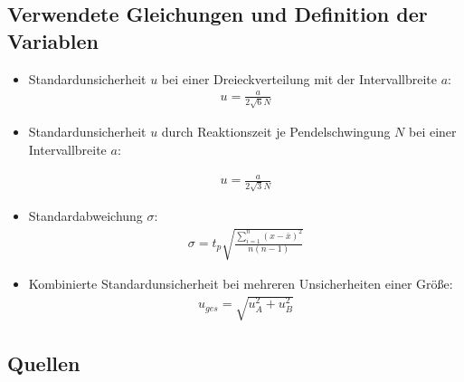 
\subsection{Verwendete Gleichungen und Definition der Variablen}\label{VGuD}
\begin{itemize}
\item Standardunsicherheit $u$ bei einer Dreieckverteilung mit der Intervallbreite $a$:
\begin{align}
	u=\frac{a}{2\sqrt{6}N} \label{su3}
\end{align} 

\item Standardunsicherheit $u$ durch Reaktionszeit je Pendelschwingung $N$ bei einer Intervallbreite $a$:

\begin{align}
	u=\frac{a}{2\sqrt{3}N} \label{sur}
\end{align} 


\item Standardabweichung $\sigma$:
\begin{align}
\sigma=t_p \sqrt{\frac{\sum_{i=1}^{n}(x-\bar{x})^2}{n(n-1)}}
\label{sigma}
\end{align}

\item Kombinierte Standardunsicherheit bei mehreren Unsicherheiten einer Größe:
\begin{align}
u_{ges}=\sqrt{u_A^2+u_B^2}
\label{kombsu}
\end{align}

\end{itemize}


\subsection{Quellen}
